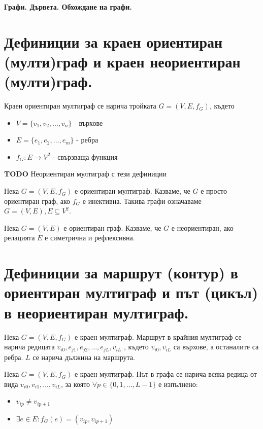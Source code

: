 \documentclass[fleqn,12pt]{article}
\begin{document}

\Large\center\textbf{Графи. Дървета. Обхождане на графи.}

\begin{flushleft}

\section{Дефиниции за краен ориентиран (мулти)граф и краен неориентиран (мулти)граф.}
Краен ориентиран мултиграф се нарича тройката $G = (V, E, f_G)$, където
\begin{itemize}
	\item $V = \{ v_1, v_2, \dots, v_n \}$ - върхове
	\item $E = \{ e_1, e_2, \dots, e_m \}$ - ребра
	\item $f_G : E \rightarrow V^2$ - свързваща функция
\end{itemize}
\vspace{10mm}

\textbf{TODO} Неориентиран мултиграф с тези дефиниции
\vspace{10mm}

Нека $G = (V, E, f_G)$ е ориентиран мултиграф. Казваме, че $G$ е просто ориентиран граф, ако $f_G$ е инективна. 
Такива графи означаваме $G = (V, E), E \subseteq V^2$.
\vspace{10mm}

Нека $G = (V, E)$ е ориентиран граф. Казваме, че $G$ е неориентиран, ако релацията $E$ е симетрична и рефлексивна.

\section{Дефиниции за маршрут (контур) в ориентиран мултиграф и път (цикъл) в неориентиран мултиграф.}

Нека $G = (V, E, f_G)$ е краен мултиграф. Маршрут в крайния мултиграф се нарича
редицата $v_{i0} , e_{j1} , e_{j2} , \dots , e_{jL} , v_{iL}$ , където $v_{i0}, v_{iL}$ са върхове, а останалите са ребра. 
$L$ се нарича дължина на маршрута.
\vspace{10mm}

Нека $G = (V, E, f_G)$ е краен мултиграф. Път в графа се нарича всяка редица от вида
$v_{i0}, v_{i1}, \dots, v_{iL}$, за която $\forall p \in \{ 0, 1, \dots, L - 1 \}$ е изпълнено:
\begin{itemize}
	\item $v_{ip} \neq v_{ip+1}$
	\item $\exists e \in E : f_G(e) = (v_{ip}, v_{ip+1})$
\end{itemize}
\vspace{10mm}


\end{flushleft}
\end{document}
